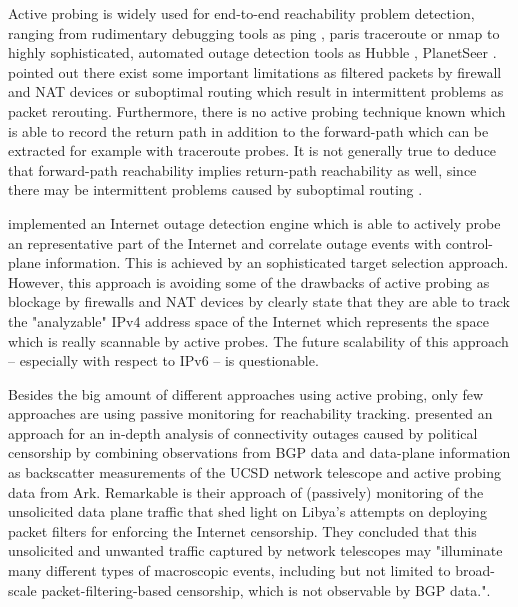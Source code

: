Active probing is widely used for end-to-end reachability problem detection, ranging from rudimentary debugging tools as ping \citep{PING}, paris traceroute \citep{traceroute} or nmap \citep{Nmap} to highly sophisticated, automated outage detection tools as Hubble \citep{Katz:2008}, PlanetSeer \citep{Zhang:2004}. \citet{Bush:Optometry} pointed out there exist some important limitations as filtered packets by firewall and NAT devices or suboptimal routing which result in intermittent problems as packet rerouting. Furthermore, there is no active probing technique known which is able to record the return path in addition to the forward-path which can be extracted for example with traceroute probes. It is not generally true to deduce that forward-path reachability implies return-path reachability as well, since there may be intermittent problems caused by suboptimal routing \citep{Bush:Optometry}.

\citet{Quan12a} implemented an Internet outage detection engine which is able to actively probe an representative part of the Internet and correlate outage events with control-plane information. This is achieved by an sophisticated target selection approach. However, this approach is avoiding some of the drawbacks of active probing as blockage by firewalls and NAT devices by clearly state that they are able to track the "analyzable" IPv4 address space of the Internet which represents the space which is really scannable by active probes. The future scalability of this approach -- especially with respect to IPv6 -- is questionable. 

Besides the big amount of different approaches using active probing, only few approaches are using passive monitoring for reachability tracking. \citet{Dainotti:2011:ACI} presented an approach for an in-depth analysis of connectivity outages caused by political censorship by combining observations from BGP data and data-plane information as backscatter measurements of the UCSD network telescope and active probing data from Ark. Remarkable is their approach of (passively) monitoring of the unsolicited data plane traffic that shed light on Libya's attempts on deploying packet filters for enforcing the Internet censorship. They concluded that this unsolicited and unwanted traffic captured by network telescopes may "illuminate many different types of macroscopic events, including but not limited to broad-scale packet-filtering-based censorship, which is not observable by BGP data."\citep{Dainotti:2011:ACI}.

